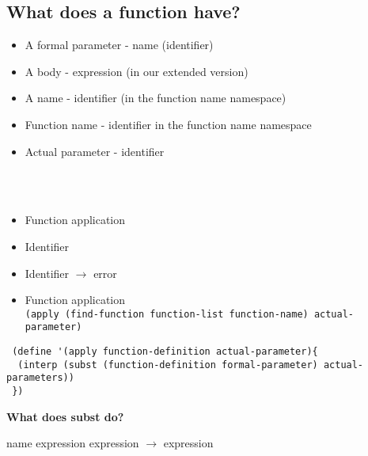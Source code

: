 \documentclass{article}
\newcommand\tab[1][1cm]{\hspace*{#1}}
\begin{document}
\subsection*{What does a function have?}
\begin{itemize}
 \item A formal parameter - name (identifier)
 \item A body - expression (in our extended version)
 \item A name - identifier (in the function name namespace)
 \item Function name - identifier in the function name namespace
 \item Actual parameter - identifier
\end{itemize}
\tab{Extend our expression data definition.}\\
\tab{We need to add two more variants.}\\
\begin{itemize}
 \item Function application
 \item Identifier
\end{itemize}
\tab{We need to extend the interpreter to deal with the two new variants in the data definition.}
\begin{itemize}
 \item Identifier $\rightarrow$ error
 \item Function application\\
 \verb|(apply (find-function function-list function-name) actual-parameter)|
\end{itemize}
\tab{Statement of purpose for apply, substitute the actual parameter for the formal parameter everywhere in the body of the function, then evaluate the result.}

\begin{verbatim}
 (define '(apply function-definition actual-parameter){
  (interp (subst (function-definition formal-parameter) actual-parameters))
 })
\end{verbatim}



\begin{flushleft}
\textbf{What does subst do?}\\
\end{flushleft}
name expression expression $\rightarrow$ expression
\end{document}
